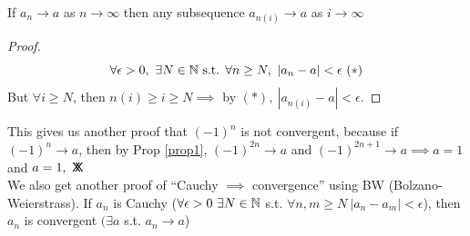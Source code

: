 \documentclass[twoside]{scrartcl}
\newcommand*{\cont}{%
  \mathsf{X}\mkern-8.5mu\mathsf{X}%
}
\begin{document}
\begin{proposition}\label{prop1}
If $a_n \to a$ as $n\to \infty$ then any subsequence $a_{n(i)} \to a$ as $i \to \infty$	
\end{proposition}

\begin{proof}
\[\forall \epsilon >0,~\exists N \in\mathbb{N} \text{ s.t. } \forall n \geq N,~|a_n - a| < \epsilon ~(*)\]	
But $\forall i \geq N$, then $n(i) \geq i \geq N \implies$ by $(*),~|a_{n(i)} - a| < \epsilon$.
\end{proof}

This gives us another proof that $(-1)^n$ is not convergent, because if $(-1)^n \to a$, then by Prop \ref{prop1}, $(-1)^{2n} \to a$ and $(-1)^{2n+1} \to a \implies a = 1$ and $a = 1,~\cont$\\

We also get another proof of ``Cauchy $\implies$ convergence'' using BW (Bolzano-Weierstrass). If $a_n$ is Cauchy ($\forall \epsilon >0 ~\exists N \in\mathbb{N}$ s.t. $\forall n,m \geq N~|a_n -a_m | < \epsilon$), then $a_n$ is convergent $(\exists a$ s.t. $a_n \to a$)
\end{document}
